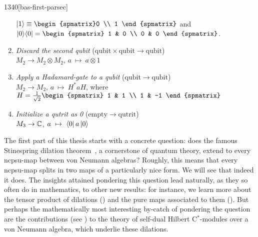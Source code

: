 \begin{parsec}{1340}[bas-first-parsec]
\begin{point}{10}
\begin{point}{20}
\begin{enumerate}
{            $\ket{1}\equiv\begin{spmatrix}0 \\ 1 \end{spmatrix}$ and
                $\ketbra{0}{0} = \begin{spmatrix} 1 & 0
                \\ 0 & 0 \end{spmatrix}$.}
\item
    \emph{Discard the second qubit} \quad
            ($\mathrm{qubit} \times \mathrm{qubit}\to \mathrm{qubit}$) \\
        $M_2 \rightarrow M_2 \otimes M_2$, \quad
        $a \ \mapsto \ a \otimes 1$
\item
    \emph{Apply a Hadamard-gate to a qubit} \quad
            ($\mathrm{qubit} \to \mathrm{qubit}$) \\
        $M_2 \rightarrow M_2$, \quad
        $a \ \mapsto \ H^*a H $, \quad where~$H = \frac{1}{\sqrt{2}}\begin{spmatrix}
            1 & 1 \\ 1 & -1
        \end{spmatrix}$
\item
    \emph{Initialize a qutrit as 0} \quad
            ($\mathrm{empty} \to \mathrm{qutrit}$) \\
        $M_3 \rightarrow \mathbb{C}$, \quad
        $a \ \mapsto \ \bra{0}a\ket{0}$
\end{enumerate}
\end{point}
\spacingfix{}
\begin{point}{30}%
The first part of this thesis starts with a concrete question:
    does the famous  Stinespring dilation theorem~\cite{stinespring},
    a cornerstone of quantum theory,
    extend to every ncpsu-map between von Neumann algebras?
Roughly, this means that every ncpsu-map  splits
    in two maps of a particularly nice form.
We will see that indeed it does.
The insights attained pondering this question lead naturally,
        as they so often do in mathematics, to other new results:
    for instance, we learn more about  the tensor product of
    dilations ()
        and the pure maps associated to them ().
But perhaps the mathematically
    most interesting by-catch of pondering the question
    are the contributions (see ) to the theory
    of self-dual Hilbert C$^*$-modules over a von Neumann algebra,
    which underlie these dilations.
\end{point}
\begin{point}{40}%

\end{point}
\end{point}
\end{parsec}
